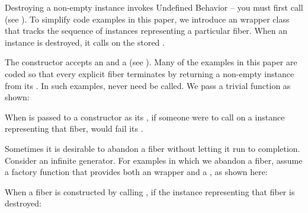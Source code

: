 \newpage
{}\label{launch}\label{appendixa}

Destroying a non-empty \fiber instance invokes Undefined Behavior -- you must
first call \anycancel (see ). To simplify code examples in this paper, we introduce
an  wrapper class that tracks the sequence of \fiber instances
representing a particular fiber. When an  instance is
destroyed, it calls \cancel on the stored \fiber.


The \fiber constructor accepts an \entryfn and a \cancelfn (see
). Many of the examples in this paper are coded so that
every explicit fiber terminates by returning a non-empty \fiber instance from
its \entryfn. In such examples, \cancel never need be called. We pass a
trivial  function as shown:


When  is passed to a \fiber constructor as its \cancelfn,
if someone were to call \cancel on a \fiber instance representing that fiber,
 would fail its .

Sometimes it is desirable to abandon a fiber without letting it run to
completion. Consider an infinite generator. For examples in which we abandon a
fiber, assume a  factory function that provides both an \entryfn
wrapper and a \cancelfn, as shown here:


When a fiber is constructed by calling , if the 
instance representing that fiber is destroyed:

